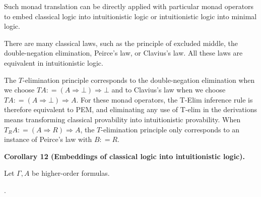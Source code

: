  
Such monad translation can be directly applied with particular monad operators to embed classical logic into intuitionistic logic or intuitionistic logic into minimal logic.\par
 
 
 
There are many classical laws, such as the principle of excluded middle, the double-negation elimination, Peirce’s law, or Clavius’s law. All these laws are equivalent in intuitionistic logic.\par
 
\begin{center}\end{center}
 
The $T$-elimination principle corresponds to the double-negation elimination when we choose $TA\mathrel{\mathop{:}}=(A\mathbin{\Rightarrow}\bot)\mathbin{\Rightarrow}\bot$ and to Clavius’s law when we choose $TA\mathrel{\mathop{:}}=(A\mathbin{\Rightarrow}\bot)\mathbin{\Rightarrow}A$. For these monad operators, the T-Elim inference rule is therefore equivalent to PEM, and eliminating any use of T-elim in the derivations means transforming classical provability into intuitionistic provability. When $T_{R}A\mathrel{\mathop{:}}=(A\mathbin{\Rightarrow}R)\mathbin{\Rightarrow}A$, the $T$-elimination principle only corresponds to an instance of Peirce’s law with $B\mathrel{\mathop{:}}=R$.\par
 
 
 
\par\medskip\noindent\textbf{Corollary 12 (Embeddings of classical logic into intuitionistic logic).}\par
 
 
Let $\Gamma,A$ be higher-order formulas.\par
  
\par{}. 
 
